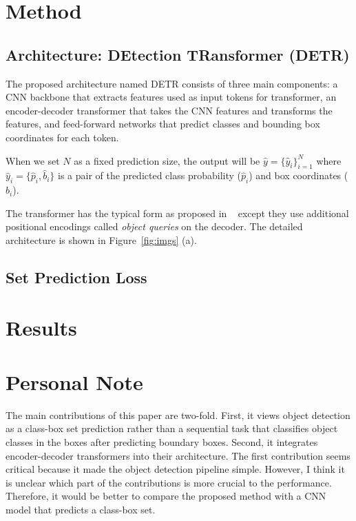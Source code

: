\documentclass[10pt,twocolumn,letterpaper]{article}
\begin{document}
\section{Method}
\subsection{Architecture: DEtection TRansformer (DETR)}
The proposed architecture named DETR consists of three main components: a CNN backbone that extracts features used as input tokens for transformer, an encoder-decoder transformer that takes the CNN features and transforms the features, and feed-forward networks that predict classes and bounding box coordinates for each token. 

When we set $N$ as a fixed prediction size, the output will be  $\hat{y} = \{\hat{y}_i\}_{i=1}^{N}$ where $\hat{y}_i = \{\hat{p}_i, \hat{b}_i\}$ is a pair of the predicted class probability ($\hat{p}_i$) and box coordinates ($\hat{b}_i$). 

The transformer has the typical form as proposed in ~\cite{} except they use additional positional encodings called \textit{object queries} on the decoder. The detailed architecture is shown in Figure~\ref{fig:imgs} (a). 

\subsection{Set Prediction Loss}



\section{Results}

\section{Personal Note}
The main contributions of this paper are two-fold. First, it views object detection as a class-box set prediction rather than a sequential task that classifies object classes in the boxes after predicting boundary boxes. Second, it integrates encoder-decoder transformers into their architecture. The first contribution seems critical because it made the object detection pipeline simple.
However, I think it is unclear which part of the contributions is more crucial to the performance. Therefore, it would be better to compare the proposed method with a CNN model that predicts a class-box set. 

{\small


}
\end{document}
